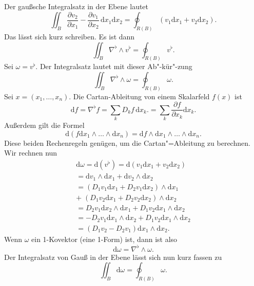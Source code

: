 \documentclass[a4paper,10pt,fleqn,twocolumn,twoside]{article}
\numberwithin{equation}{section}
\begin{document}
Der gaußsche Integralsatz in der Ebene lautet
\begin{equation}
\iint_B \frac{\partial v_2}{\partial x_1}
- \frac{\partial v_1}{\partial x_2}\,\mathrm dx_1\mathrm dx_2
= \oint_{R(B)} (v_1\mathrm dx_1+v_2\mathrm dx_2).
\end{equation} 
Das lässt sich kurz schreiben. Es ist dann
\begin{equation}
\iint_B \nabla^\flat\wedge v^\flat = \oint_{R(B)}  v^\flat.
\end{equation}
Sei $\omega= v^\flat$.
Der Integralsatz lautet mit dieser Ab"-kür"-zung
\begin{equation}
\iint_B \nabla^\flat\wedge\omega
= \oint_{R(B)} \omega.
\end{equation}
%
Sei $x=(x_1,\ldots,x_n)$.
Die Cartan-Ableitung von einem Skalarfeld $f(x)$ ist
\begin{equation}
\mathrm df = \nabla^\flat f
= \sum_{k} D_k f\,\mathrm dx_k.
= \sum_{k} \frac{\partial f}{\partial x_k}\mathrm dx_k.
\end{equation}
Außerdem gilt die Formel
\begin{equation}
\mathrm d(f\mathrm dx_1\wedge\ldots\wedge\mathrm dx_n)
= \mathrm df\wedge\mathrm dx_1\wedge\ldots\wedge\mathrm dx_n.
\end{equation}
Diese beiden Rechenregeln genügen, um die Cartan"=Ableitung
zu berechnen. Wir rechnen nun
\begin{gather*}
\mathrm d\omega
= \mathrm d(v^\flat)
= \mathrm d(v_1\mathrm dx_1+v_2\mathrm dx_2)\\
= \mathrm dv_1\wedge\mathrm dx_1+\mathrm dv_2\wedge\mathrm dx_2\\
= (D_1v_1\mathrm dx_1+D_2v_1\mathrm dx_2)\wedge\mathrm dx_1\\
+\;(D_1v_2\mathrm dx_1+D_2v_2\mathrm dx_2)\wedge\mathrm dx_2\\
= D_2v_1\mathrm dx_2\wedge\mathrm dx_1
+ D_1v_2\mathrm dx_1\wedge\mathrm dx_2\\
= -D_2v_1\mathrm dx_1\wedge\mathrm dx_2
+ D_1v_2\mathrm dx_1\wedge\mathrm dx_2\\
= (D_1v_2-D_2v_1)\mathrm dx_1\wedge\mathrm dx_2.
\end{gather*}
Wenn $\omega$ ein 1-Kovektor (eine 1-Form) ist, dann ist also
\begin{equation}
\mathrm d\omega
= \nabla^\flat\wedge\omega.
\end{equation}
Der Integralsatz von Gauß in der Ebene lässt sich nun kurz fassen zu
\begin{equation}
\iint_B \mathrm d\omega
= \oint_{R(B)}\omega.
\end{equation}
\end{document}
